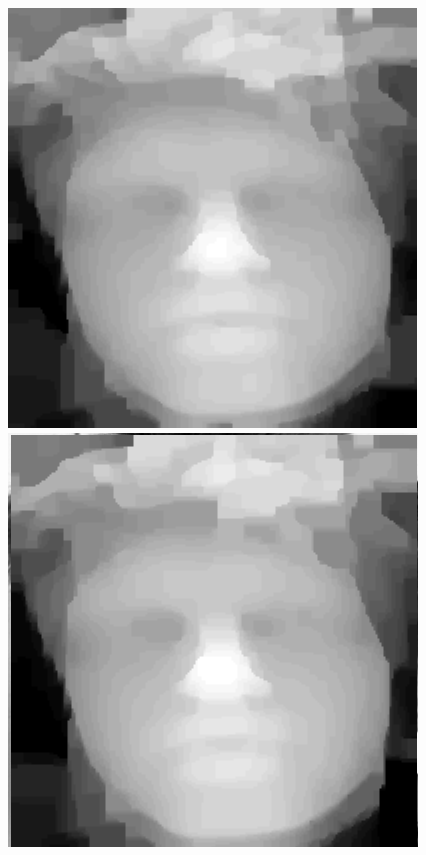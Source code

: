 \documentclass[]{article}
\begin{document}
\begin{figure}[h]
\begin{minipage}{0.24\linewidth}
		\includegraphics[width=\linewidth]{results/thierry_n5_l2.png}
	\end{minipage}\hfill
	\begin{minipage}{0.24\linewidth}
		\includegraphics[width=\linewidth]{results/thierry_n7_l2.png}

\end{minipage}
\end{figure}
\end{document}
